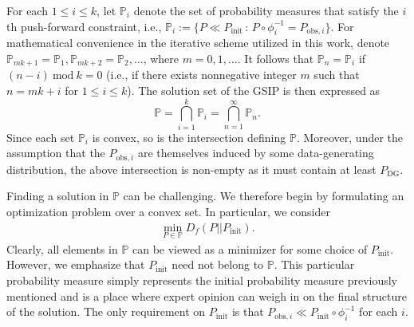 \documentclass{article}
\newcommand{\p}{\mathbb{P}}
\newcommand{\initmeas}{P_{\text{init}}}
\newcommand{\obsmeasi}{P_{\text{obs}, i}}
\begin{document}
For each $1\leq i\leq k$, let $\p_{i}$ denote the set of probability measures that satisfy the $i$th push-forward constraint, i.e., $\p_{i} := \{P\ll \initmeas\, :\,  P\circ\phi_{i}^{-1} = P_{\text{obs},i}\}$. 
For mathematical convenience in the iterative scheme utilized in this work, denote $\p_{mk+1}=\p_1, \p_{mk+2}=\p_2, \ldots$, where $m=0, 1, \ldots$. 
It follows that $\p_n=\p_i$ if $(n-i) \mathrm{~mod~} k =0$ (i.e., if there exists nonnegative integer $m$ such that $n=mk+i$ for $1\leq i\leq k$).
The solution set of the GSIP is then expressed as 
\begin{equation*}
    \p = \bigcap_{i = 1}^k \p_{i} = \bigcap_{n = 1}^\infty \p_{n}.
\end{equation*} 
Since each set $\p_i$ is convex, so is the intersection defining $\p$. 
Moreover, under the assumption that the $P_{\text{obs},i}$ are themselves induced by some data-generating distribution, the above intersection is non-empty as it must contain at least $P_\text{DG}$. 

Finding a solution in $\p$ can be challenging. 
We therefore begin by formulating an optimization problem over a convex set. 
In particular, we consider
\begin{align} \label{overall_min}
    \min_{P \in \p}D_f(P|| P_\text{init}).    
\end{align}
Clearly, all elements in $\p$ can be viewed as a minimizer for some choice of $P_\text{init}$. 
However, we emphasize that $P_\text{init}$ need not belong to $\p$. 
This particular probability measure simply represents the initial probability measure previously mentioned and is a place where expert opinion can weigh in on the final structure of the solution.
The only requirement on $\initmeas$ is that $\obsmeasi \ll \initmeas\circ \phi_i^{-1}$ for each $i$. 
\end{document}
